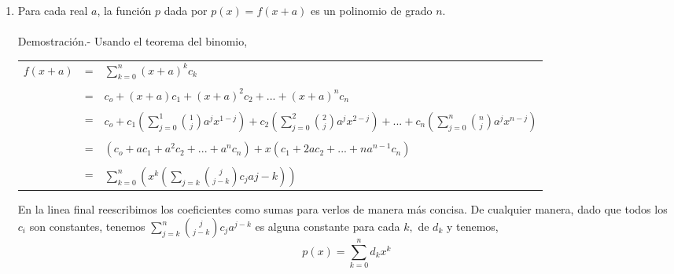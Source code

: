 \begin{enumerate}[ \bfseries 1.]
\begin{enumerate}[\bfseries (a)]
                \item Para cada real $a$, la función $p$ dada por $p(x)=f(x+a)$ es un polinomio de grado $n.$\\\\
                Demostración.- \; Usando el teorema del binomio,
                    \begin{center}
                        \begin{tabular}{r c l}
                            $f(x+a)$&=&$ \displaystyle\sum_{k=0}^{n} (x+a)^k c_k$\\\\
                            &=&$c_o + (x+a)c_1 + (x+a)^2 c_2 + ...+(x+a)^n c_n$\\\\
                            &=&$ c_o + c_1 \left( \displaystyle\sum_{j=0}^{1} {1 \choose j} a^j x^{1-j} \right) + c_2 \left( \displaystyle\sum_{j=0}^2 {2 \choose j} a^j x^{2-j} \right) 
                            + ... + c_n \left( \displaystyle\sum_{j=0}^{n} {n \choose j} a^j x^{n-j} \right)$\\\\
                            &=&$(c_o + ac_1 + a^2 c_2 + ... + a^n c_n) + x(c_1 + 2ac_2 + ... + na^{n-1} c_n)$\\\\
                            &=&$\displaystyle\sum_{k=0}^n \left( x^k \left( \displaystyle\sum_{j=k} {j \choose j-k} c_j a{j-k}\right) \right)$\\
                        \end{tabular}
                    \end{center}
                En la linea final reescribimos los coeficientes como sumas para verlos de manera más concisa. De cualquier manera, dado que todos los $c_i$ son constantes, tenemos $\displaystyle\sum_{j=k}^n {j \choose j-k} c_j a^{j-k}$ es alguna constante para cada $k,$ de $d_k$ y tenemos, $$p(x) = \displaystyle\sum_{k=0}^n d_k x^k$$\\\\


\end{enumerate}
\end{enumerate}

